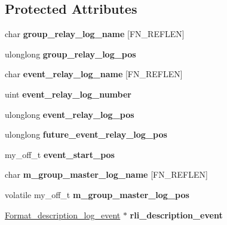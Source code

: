 \subsection*{Protected Attributes}
\begin{DoxyCompactItemize}
\item 
\mbox{\label{classRelay__log__info_a83f520fd0ba300d87a0037743e6ffede}} 
char {\bfseries group\+\_\+relay\+\_\+log\+\_\+name} \mbox{[}F\+N\+\_\+\+R\+E\+F\+L\+EN\mbox{]}
\item 
\mbox{\label{classRelay__log__info_a2f1874fce058e237fafbea6b52273018}} 
ulonglong {\bfseries group\+\_\+relay\+\_\+log\+\_\+pos}
\item 
\mbox{\label{classRelay__log__info_ae63999471cc027d6a5d1bdb5c2a9ae20}} 
char {\bfseries event\+\_\+relay\+\_\+log\+\_\+name} \mbox{[}F\+N\+\_\+\+R\+E\+F\+L\+EN\mbox{]}
\item 
\mbox{\label{classRelay__log__info_a76b1b972ff731e70e10097b4c76af108}} 
uint {\bfseries event\+\_\+relay\+\_\+log\+\_\+number}
\item 
\mbox{\label{classRelay__log__info_a33ed136846ea7c3239d712486255ab19}} 
ulonglong {\bfseries event\+\_\+relay\+\_\+log\+\_\+pos}
\item 
\mbox{\label{classRelay__log__info_ae8cfd4bfc250442fde6e897a36afae3d}} 
ulonglong {\bfseries future\+\_\+event\+\_\+relay\+\_\+log\+\_\+pos}
\item 
\mbox{\label{classRelay__log__info_a48028f0544fc8c0adfe9e2599b2c3488}} 
my\+\_\+off\+\_\+t {\bfseries event\+\_\+start\+\_\+pos}
\item 
\mbox{\label{classRelay__log__info_a05a2e11975a50e3e316e293ffd1a72fd}} 
char {\bfseries m\+\_\+group\+\_\+master\+\_\+log\+\_\+name} \mbox{[}F\+N\+\_\+\+R\+E\+F\+L\+EN\mbox{]}
\item 
\mbox{\label{classRelay__log__info_a464e00af0a776b6a617a96d83c8006a1}} 
volatile my\+\_\+off\+\_\+t {\bfseries m\+\_\+group\+\_\+master\+\_\+log\+\_\+pos}
\item 
\mbox{\label{classRelay__log__info_ad1fba5148f3e9f8b4e802dd7357c6ead}} 
\mbox{\hyperlink{classFormat__description__log__event}{Format\+\_\+description\+\_\+log\+\_\+event}} $\ast$ {\bfseries rli\+\_\+description\+\_\+event}
\end{DoxyCompactItemize}
